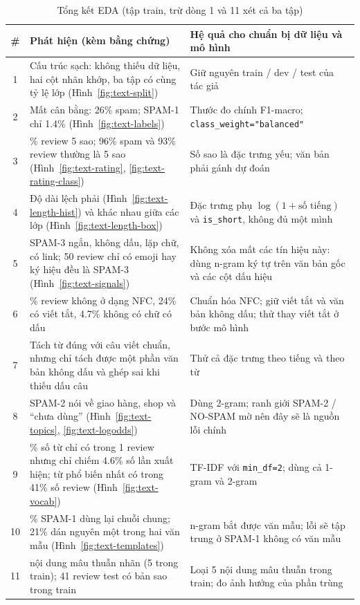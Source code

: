 \begin{table}[H]
\centering
\caption{Tổng kết EDA (tập train, trừ dòng 1 và 11 xét cả ba tập)}
\label{tab:text-eda-summary}
\small
\begin{tabular}{c>{\raggedright\arraybackslash}p{6.8cm}>{\raggedright\arraybackslash}p{7.0cm}}
\toprule
\# & Phát hiện (kèm bằng chứng) & Hệ quả cho chuẩn bị dữ liệu và mô hình\\
\midrule
1 & Cấu trúc sạch: không thiếu dữ liệu, hai cột nhãn khớp, ba tập có cùng tỷ lệ lớp (Hình~\ref{fig:text-split}) & Giữ nguyên train / dev / test của tác giả\\
2 & Mất cân bằng: 26\% spam; SPAM-1 chỉ 1.4\% (Hình~\ref{fig:text-labels}) & Thước đo chính F1-macro; \texttt{class\_weight="balanced"}\\
3 & 93.5\% review 5 sao; 96\% spam và 93\% review thường là 5 sao (Hình~\ref{fig:text-rating}, \ref{fig:text-rating-class}) & Số sao là đặc trưng yếu; văn bản phải gánh dự đoán\\
4 & Độ dài lệch phải (Hình~\ref{fig:text-length-hist}) và khác nhau giữa các lớp (Hình~\ref{fig:text-length-box}) & Đặc trưng phụ $\log(1+\text{số tiếng})$ và \texttt{is\_short}, không đủ một mình\\
5 & SPAM-3 ngắn, không dấu, lặp chữ, có link; 50 review chỉ có emoji hay ký hiệu đều là SPAM-3 (Hình~\ref{fig:text-signals}) & Không xóa mất các tín hiệu này: dùng n-gram ký tự trên văn bản gốc và các cột dấu hiệu\\
6 & 1.5\% review không ở dạng NFC, 24\% có viết tắt, 4.7\% không có chữ có dấu & Chuẩn hóa NFC; giữ viết tắt và văn bản không dấu; thử thay viết tắt ở bước mô hình\\
7 & Tách từ đúng với câu viết chuẩn, nhưng chỉ tách được một phần văn bản không dấu và ghép sai khi thiếu dấu câu & Thử cả đặc trưng theo tiếng và theo từ\\
8 & SPAM-2 nói về giao hàng, shop và ``chưa dùng'' (Hình~\ref{fig:text-topics}, \ref{fig:text-logodds}) & Dùng 2-gram; ranh giới SPAM-2 / NO-SPAM mờ nên đây sẽ là nguồn lỗi chính\\
9 & 67\% số từ chỉ có trong 1 review nhưng chỉ chiếm 4.6\% số lần xuất hiện; từ phổ biến nhất có trong 41\% số review (Hình~\ref{fig:text-vocab}) & TF-IDF với \texttt{min\_df=2}; dùng cả 1-gram và 2-gram\\
10 & 49\% SPAM-1 dùng lại chuỗi chung; 21\% dán nguyên một trong hai văn mẫu (Hình~\ref{fig:text-templates}) & n-gram bắt được văn mẫu; lỗi sẽ tập trung ở SPAM-1 không có văn mẫu\\
11 & 7 nội dung mâu thuẫn nhãn (5 trong train); 41 review test có bản sao trong train & Loại 5 nội dung mâu thuẫn trong train; đo ảnh hưởng của phần trùng\\
\bottomrule
\end{tabular}
\end{table}

